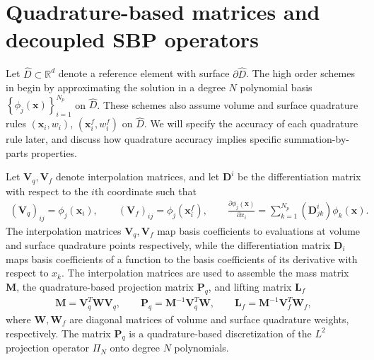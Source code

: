 \documentclass{svjour3}                     %
\renewcommand{\hat}{\widehat}
\newcommand{\pd}[2]{\frac{\partial#1}{\partial#2}}
\newcommand{\LRp}[1]{\left( #1 \right)}
\newcommand{\LRc}[1]{\left\{ #1 \right\}}
\renewcommand{\note}[1]{{\color{blue}{#1}}}
\begin{document}



\section{Quadrature-based matrices and decoupled SBP operators}
\label{sec:sbp}
Let $\hat{D} \subset\mathbb{R}^d$ denote a reference element with surface $\partial \hat{D}$.  
The high order schemes in \cite{chan2017discretely, chan2018discretely} begin by approximating the solution in a degree $N$ polynomial basis $\LRc{\phi_j({\bm{x}})}_{i=1}^{N_p}$ on $\hat{D}$.  These schemes also assume volume and surface quadrature rules $({\bm{x}}_i, w_i)$, $\LRp{{\bm{x}}^f_i,w^f_i}$ on $\hat{D}$.  We will specify the accuracy of each quadrature rule later, and discuss how quadrature accuracy implies specific summation-by-parts properties.  

Let $\bm{V}_q,\bm{V}_f$ denote interpolation matrices, and let $\bm{D}^i$ be the differentiation matrix with respect to the $i$th coordinate such that
\begin{gather}
\LRp{\bm{V}_q}_{ij} = \phi_j(\bm{x}_i), \qquad \LRp{\bm{V}_f}_{ij} = \phi_j(\bm{x}^f_i), \qquad \pd{\phi_j(\bm{x})}{x_i} = \sum_{k=1}^{N_p} \LRp{\bm{D}^i_{jk}} \phi_k(\bm{x}).
\end{gather}
The interpolation matrices $\bm{V}_q,\bm{V}_f$ map basis coefficients to evaluations at volume and surface quadrature points respectively, while the differentiation matrix ${\bm{D}}_i$ maps basis coefficients of a function to the basis coefficients of its derivative with respect to $x_k$.  The interpolation matrices are used to assemble the mass matrix $\bm{M}$, the quadrature-based projection matrix $\bm{P}_q$, and lifting matrix $\bm{L}_f$
\begin{gather}
\bm{M} = \bm{V}_q^T\bm{W}\bm{V}_q, \qquad \bm{P}_q = \bm{M}^{-1}\bm{V}_q^T\bm{W}, \qquad \bm{L}_f = \bm{M}^{-1}\bm{V}_f^T\bm{W}_f,
\end{gather}
where $\bm{W}, \bm{W}_f$ are diagonal matrices of volume and surface quadrature weights, respectively.  The matrix $\bm{P}_q$ is a quadrature-based discretization of the $L^2$ projection operator $\Pi_N$ onto degree $N$ polynomials.
\end{document}
